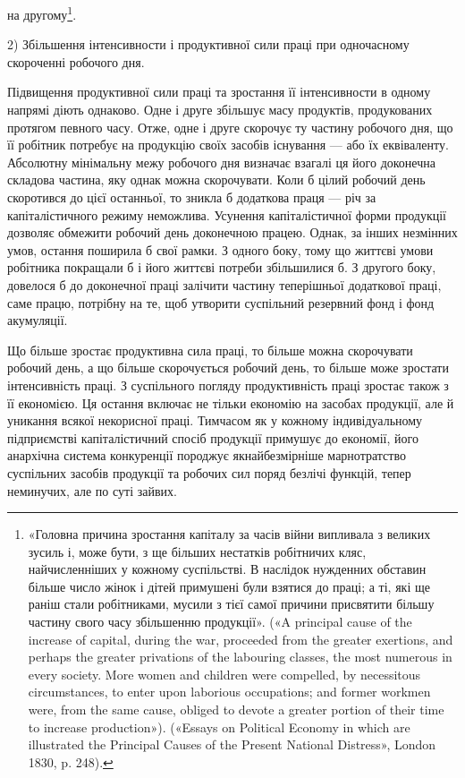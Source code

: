 на другому\footnote{
«Головна причина зростання капіталу за часів війни випливала
з великих зусиль і, може бути, з ще більших нестатків робітничих кляс,
найчисленніших у кожному суспільстві. В наслідок нужденних обставин
більше число жінок і дітей примушені були взятися до праці; а ті, які
ще раніш стали робітниками, мусили з тієї самої причини присвятити
більшу частину свого часу збільшенню продукції». («A principal cause
of the increase of capital, during the war, proceeded from the greater exertions,
and perhaps the greater privations of the labouring classes, the most
numerous in every society. More women and children were compelled, by
necessitous circumstances, to enter upon laborious occupations; and former
workmen were, from the same cause, obliged to devote a greater portion
of their time to increase production»). («Essays on Political Economy in
which are illustrated the Principal Causes of the Present National Distress»,
London 1830, p. 248).
}.

2) Збільшення інтенсивности і продуктивної сили праці при
одночасному скороченні робочого дня.

Підвищення продуктивної сили праці та зростання її інтенсивности
в одному напрямі діють однаково. Одне і друге збільшує
масу продуктів, продукованих протягом певного часу. Отже,
одне і друге скорочує ту частину робочого дня, що її робітник
потребує на продукцію своїх засобів існування — або їх еквіваленту.
Абсолютну мінімальну межу робочого дня визначає
взагалі ця його доконечна складова частина, яку однак можна
скорочувати. Коли б цілий робочий день скоротився до цієї останньої,
то зникла б додаткова праця — річ за капіталістичного
режиму неможлива. Усунення капіталістичної форми продукції
дозволяє обмежити робочий день доконечною працею. Однак, за
інших незмінних умов, остання поширила б свої рамки. З одного
боку, тому що життєві умови робітника покращали б і його життєві
потреби збільшилися б. З другого боку, довелося б до доконечної
праці залічити частину теперішньої додаткової праці,
саме працю, потрібну на те, щоб утворити суспільний резервний
фонд і фонд акумуляції.

Що більше зростає продуктивна сила праці, то більше можна
скорочувати робочий день, а що більше скорочується робочий
день, то більше може зростати інтенсивність праці. З суспільного
погляду продуктивність праці зростає також з її економією. Ця
остання включає не тільки економію на засобах продукції, але й
уникання всякої некорисної праці. Тимчасом як у кожному індивідуальному
підприємстві капіталістичний спосіб продукції примушує
до економії, його анархічна система конкуренції породжує
якнайбезмірніше марнотратство суспільних засобів продукції
та робочих сил поряд безлічі функцій, тепер неминучих, але по
суті зайвих.

